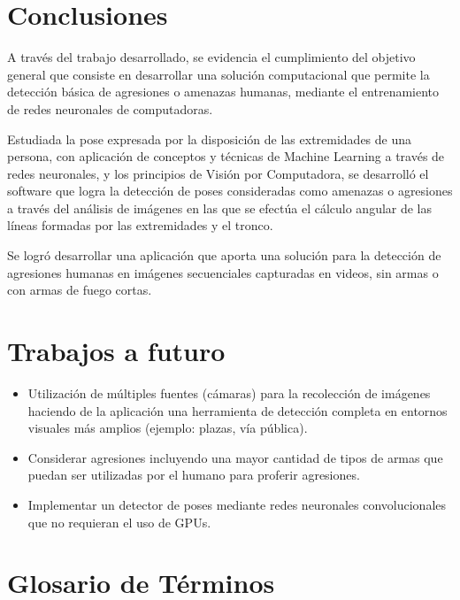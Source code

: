 \documentclass[a4paper,12pt,oneside,spanish]{book}
\begin{document}
\newpage
\chapter{Conclusiones}
A través del trabajo desarrollado, se evidencia el cumplimiento del objetivo general que consiste en desarrollar una solución computacional que permite la detección básica de agresiones o amenazas humanas, mediante el entrenamiento de redes neuronales de computadoras.\par

Estudiada la pose expresada por la disposición de las extremidades de una persona, con aplicación de conceptos y técnicas de Machine Learning a través de redes neuronales, y los principios de Visión por Computadora, se desarrolló el software que logra la detección de poses consideradas como amenazas o agresiones a través del análisis de imágenes en las que se efectúa el cálculo angular de las líneas formadas por las extremidades y el tronco.\par

Se logró desarrollar una aplicación que aporta una solución para la detección de agresiones humanas en imágenes secuenciales capturadas en videos, sin armas o con armas de fuego cortas.\par

\chapter{Trabajos a futuro}
\begin{itemize}
	\item Utilización de múltiples fuentes (cámaras) para la recolección de imágenes haciendo de la aplicación una herramienta de detección completa en entornos visuales más amplios (ejemplo: plazas, vía pública).\par

	\item Considerar agresiones incluyendo una mayor cantidad de tipos de armas que puedan ser utilizadas por el humano para proferir agresiones.\par

\item Implementar un detector de poses mediante redes neuronales convolucionales que no requieran el uso de GPUs.\par
\end{itemize}

\newpage
\chapter{Glosario de Términos}
\setlength{\parskip}{-1.0em}
\setlength{\parindent}{0em}
 
\end{document}
